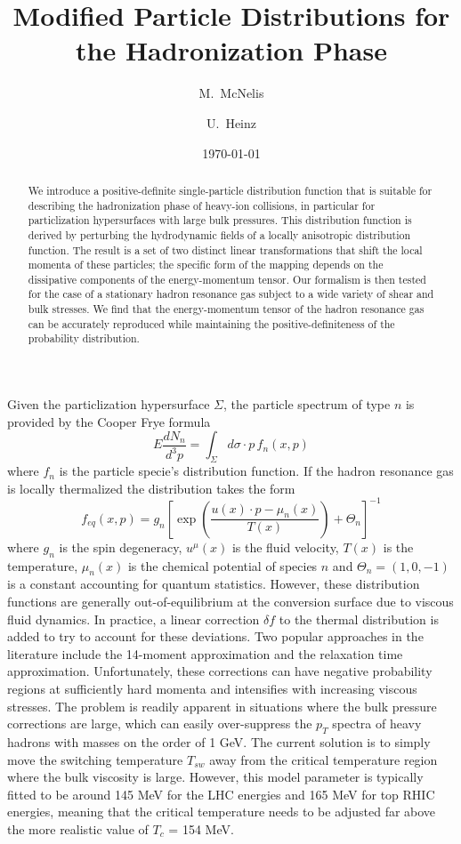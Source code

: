\documentclass[showpacs,aps,prd,nofootinbib,showkeys,superscriptaddress,twocolumn]{revtex4-1}
\newcommand{\be}{\begin{equation}}
\newcommand{\ee}{\end{equation}}
\newcommand{\feq}{f_{eq}}
\begin{document}
\title{Modified Particle Distributions for the Hadronization Phase}
\date{\today}
\author{M.~McNelis}
\author{U.~Heinz}
\begin{abstract}
We introduce a positive-definite single-particle distribution function that is suitable for describing the hadronization phase of heavy-ion collisions, in particular for particlization hypersurfaces with large bulk pressures. This distribution function is derived by perturbing the hydrodynamic fields of a locally anisotropic distribution function. The result is a set of two distinct linear transformations that shift the local momenta of these particles; the specific form of the mapping depends on the dissipative components of the energy-momentum tensor. Our formalism is then tested for the case of a stationary hadron resonance gas subject to a wide variety of shear and bulk stresses. We find that the energy-momentum tensor of the hadron resonance gas can be accurately reproduced while maintaining the positive-definiteness of the probability distribution. 
\end{abstract}
\maketitle
Given the particlization hypersurface $\Sigma$, the particle spectrum of type $n$ is provided by the Cooper Frye formula 
\be
E \frac{dN_n}{d^3p} = \int_\Sigma d\sigma \cdot p \, f_n(x,p) 
\ee
where $f_n$ is the particle specie's distribution function. If the hadron resonance gas is locally thermalized the distribution takes the form 
\be
\feq(x,p) = g_n \left[\exp\left(\frac{u(x)\cdot p - \mu_n(x)}{T(x)}\right) + \Theta_n\right]^{-1}
\ee
where $g_n$ is the spin degeneracy, $u^\mu(x)$ is the fluid velocity, $T(x)$ is the temperature, $\mu_n(x)$ is the chemical potential of species $n$ and $\Theta_n = (1,0,-1)$ is a constant accounting for quantum statistics. However, these distribution functions are generally out-of-equilibrium at the conversion surface due to viscous fluid dynamics. In practice, a linear correction $\delta f$ to the thermal distribution is added to try to account for these deviations. Two popular approaches in the literature include the 14-moment approximation and the relaxation time approximation. Unfortunately, these corrections can have negative probability regions at sufficiently hard momenta and intensifies with increasing viscous stresses. The problem is readily apparent in situations where the bulk pressure corrections are large, which can easily over-suppress the $p_T$ spectra of heavy hadrons with masses on the order of 1 GeV. The current solution is to simply move the switching temperature $T_{sw}$ away from the critical temperature region where the bulk viscosity is large. However, this model parameter is typically fitted to be around 145 MeV for the LHC energies and 165 MeV for top RHIC energies, meaning that the critical temperature needs to be adjusted far above the more realistic value of $T_c$ = 154 MeV. 
\end{document}

